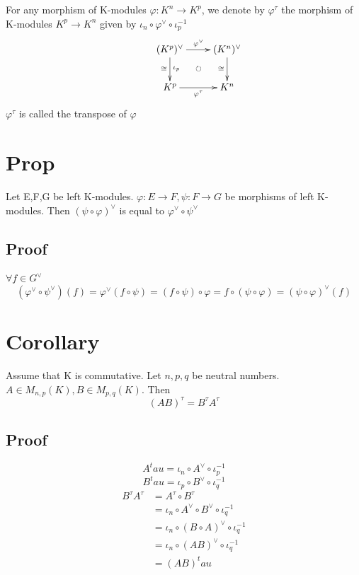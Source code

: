 \documentclass{book}
\begin{document}
For any morphism of K-modules $\varphi:K^n\rightarrow K^p$, we denote by $\varphi^\tau$ the morphism of K-modules $K^p\rightarrow K^n$ given by $\iota_n\circ\varphi^\vee\circ\iota_p^{-1}$
$$\xymatrix{ 
  & (K^p)^\vee \ar@{}|(.5)\circlearrowright[dr]\ar[d]^{\iota_p}_\cong  \ar[r]^{\varphi^\vee}  & (K^n)^\vee \ar[d]_\cong\\
  & K^p \ar[r]_{\varphi^\tau} & K^n}$$
$\varphi^\tau$ is called the transpose of $\varphi$
\section{Prop}
Let E,F,G be left K-modules. $\varphi:E\rightarrow F,\psi:F\rightarrow G$ be morphisms of left K-modules. Then $(\psi\circ\varphi)^\vee$ is equal to $\varphi^\vee\circ\psi^\vee$
\subsection*{Proof}
$\forall f\in G^\vee$$$(\varphi^\vee\circ\psi^\vee)(f)=\varphi^\vee(f\circ\psi)=(f\circ\psi)\circ\varphi=f\circ(\psi\circ\varphi)=(\psi\circ\varphi)^\vee(f)$$
\section{Corollary}
Assume that K is commutative. Let $n,p,q$ be neutral numbers. $A\in M_{n,p}(K),B\in M_{p,q}(K)$. Then $$(AB)^\tau=B^\tau A^\tau$$
\subsection*{Proof}$$A^tau=\iota_n\circ A^\vee\circ \iota_p^{-1}$$
$$B^tau=\iota_p\circ B^\vee\circ \iota_q^{-1}$$
$$\begin{aligned}
    B^\tau A^\tau &=A^\tau\circ B^\tau\\ &=\iota_n\circ A^\vee \circ B^\vee \circ \iota_q^{-1}\\
    &=\iota_n\circ (B\circ A)^\vee\circ \iota_q^{-1}\\
    &=\iota_n\circ (AB)^\vee\circ \iota_q^{-1}\\
    &=(AB)^tau
\end{aligned}$$
\end{document}
